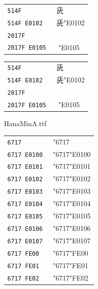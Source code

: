 \documentclass[a4paper,12pt]{article}
\def\IVS#1{\relax\Uchar"#1\relax\ignorespaces}
\begin{document}
\parindent0pt


{

\begin{tabular}{>{\tt}ll}
  514F          & 兏 \\
  514F E0102    & 兏\IVS{E0102} \\
  2017F         & 𠅿 \\
  2017F E0105   & 𠅿\IVS{E0105} \\
\end{tabular}\par}

{

\begin{tabular}{>{\tt}ll}
  514F          & 兏 \\
  514F E0102    & 兏\IVS{E0102} \\
  2017F         & 𠅿 \\
  2017F E0105   & 𠅿\IVS{E0105} \\
\end{tabular}\par}

\medskip
HanaMinA.ttf\\
\def\AX{6717}
\begin{tabular}[t]{>{\tt}ll}
  \AX          & \Uchar\expandafter"\AX\relax\\
  \AX\ E0100    & \Uchar\expandafter"\AX\relax\IVS{E0100}\\
  \AX\ E0101    & \Uchar\expandafter"\AX\relax\IVS{E0101}\\
  \AX\ E0102    & \Uchar\expandafter"\AX\relax\IVS{E0102}\\
  \AX\ E0103    & \Uchar\expandafter"\AX\relax\IVS{E0103}\\
  \AX\ E0104    & \Uchar\expandafter"\AX\relax\IVS{E0104}\\
  \AX\ E0105    & \Uchar\expandafter"\AX\relax\IVS{E0105}\\
  \AX\ E0106    & \Uchar\expandafter"\AX\relax\IVS{E0106}\\
  \AX\ E0107    & \Uchar\expandafter"\AX\relax\IVS{E0107}\\
  \AX\ FE00    & \Uchar\expandafter"\AX\relax\IVS{FE00}\\
  \AX\ FE01    & \Uchar\expandafter"\AX\relax\IVS{FE01}\\
  \AX\ FE02    & \Uchar\expandafter"\AX\relax\IVS{FE02}\\
\end{tabular}
\end{document}
